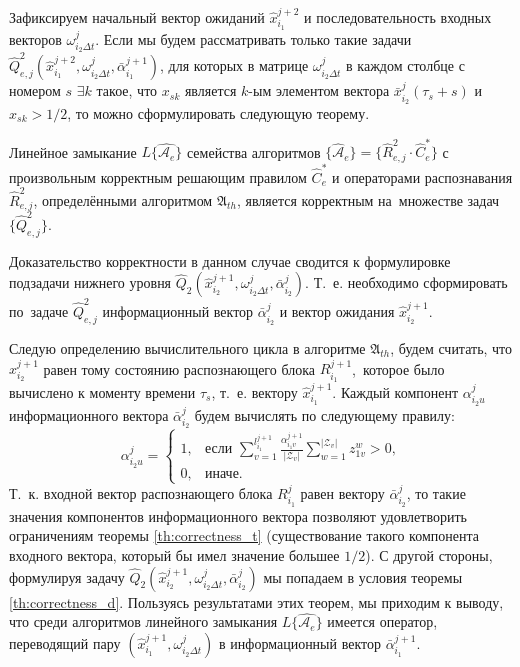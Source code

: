 Зафиксируем начальный вектор ожиданий $\hat x_{i_1}^{j+2}$ и последовательность входных векторов $\omega_{i_2\Delta{t}}^j$. Если мы будем рассматривать только такие задачи $\hat Q_{e,j}^2(\hat x_{i_1}^{j+2},\omega_{i_2\Delta{t}}^j,\bar\alpha_{i_1}^{j+1})$, для которых в матрице $\omega_{i_2\Delta{t}}^j$ в каждом столбце с номером $s$ ${\exists}k$ такое, что $x_{sk}$ является $k$-ым элементом вектора $\bar x_{i_2}^j(\tau_s+s)$ и $x_{sk}>1/2$, то можно сформулировать следующую теорему.
		
\begin{Theorem}
	Линейное замыкание $L\{\hat{\mathcal A_e}\}$ семейства алгоритмов $\{\hat{\mathcal A}_e\}=\{\hat R_{e,j}^2\cdot\hat C_e^*\}$ с произвольным корректным решающим правилом $\hat C_e^*$ и операторами распознавания $\hat R_{e,j}^2$, определёнными алгоритмом $\mathfrak A_{th}$, является корректным на~множестве задач $\{\hat Q_{e,j}^2\}$.
\end{Theorem}

\begin{Proof}
	Доказательство корректности в данном случае сводится к формулировке подзадачи нижнего уровня $\hat Q_2(\hat x_{i_2}^{j+1},\omega_{i_2\Delta t}^j,\bar\alpha_{i_2}^j)$. Т.~е. необходимо сформировать по~задаче $\hat Q_{e,j}^2$ информационный вектор $\bar\alpha_{i_2}^j$ и вектор ожидания $\hat x_{i_2}^{j+1}$.
	
	Следую определению вычислительного цикла в алгоритме $\mathfrak A_{th}$, будем считать, что $\hat x_{i_2}^{j+1}$ равен тому состоянию распознающего блока $R_{i_1}^{j+1}$,~которое было вычислено к моменту времени $\tau_s$, т.~е. вектору $\hat x_{i_1}^{j+1}$. Каждый компонент $\alpha_{i_2u}^j$ информационного вектора $\bar\alpha_{i_2}^j$ будем вычислять по следующему правилу:
	\[
		\alpha_{i_2u}^j=\begin{cases}
			1, & \text{если $\sum\limits_{v=1}^{l_{i_1}^{j+1}}\frac{\alpha_{i_1v}^{j+1}}{|\mathcal{Z}_v|}\sum\limits_{w=1}^{|\mathcal{Z}_v|}z_{1v}^w>0$,}\\
			
			0, & \text{иначе.}
		\end{cases}
	\]
	Т.~к. входной вектор распознающего блока $R_{i_1}^j$ равен вектору $\bar\alpha_{i_2}^j$, то такие значения компонентов информационного вектора позволяют удовлетворить ограничениям теоремы \ref{th:correctness_t} (существование такого компонента входного вектора, который бы имел значение большее $1/2$). С другой стороны, формулируя задачу $\hat Q_2(\hat x_{i_2}^{j+1},\omega_{i_2\Delta t}^j,\bar\alpha_{i_2}^j)$ мы попадаем в условия теоремы \ref{th:correctness_d}. Пользуясь результатами этих теорем, мы приходим к выводу, что среди алгоритмов линейного замыкания $L\{\hat{\mathcal A_e}\}$ имеется оператор, переводящий пару $(\hat x_{i_1}^{j+1},\omega_{i_2\Delta t}^j)$ в информационный вектор $\bar\alpha_{i_1}^{j+1}$.
\end{Proof}

